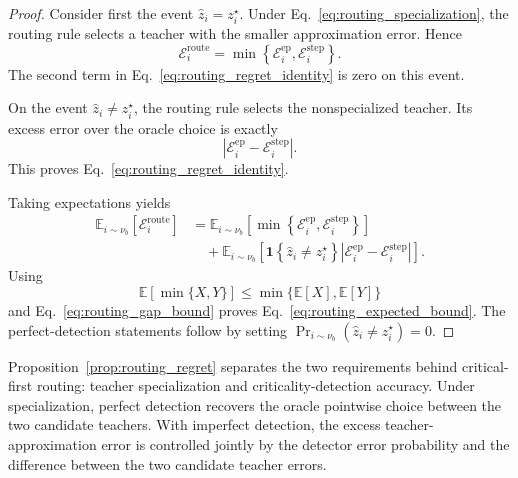 \documentclass{llmxive}
\begin{document}
\begin{proof}
Consider first the event
\(\widehat z_i=z_i^\star\). Under
Eq.~\ref{eq:routing_specialization}, the routing rule selects a teacher
with the smaller approximation error. Hence
\begin{equation*}
 \mathcal E_i^{\mathrm{route}}
 =
 \min
 \left\{
   \mathcal E_i^{\mathrm{ep}},
   \mathcal E_i^{\mathrm{step}}
 \right\}.
\end{equation*}
The second term in Eq.~\ref{eq:routing_regret_identity} is zero on this
event.

On the event
\(\widehat z_i\ne z_i^\star\), the routing rule selects the nonspecialized
teacher. Its excess error over the oracle choice is exactly
\begin{equation*}
 \left|
   \mathcal E_i^{\mathrm{ep}}
   -
   \mathcal E_i^{\mathrm{step}}
 \right|.
\end{equation*}
This proves Eq.~\ref{eq:routing_regret_identity}.

Taking expectations yields
\begin{equation*}
\begin{aligned}
 \mathbb E_{i\sim\nu_b}
 \left[
   \mathcal E_i^{\mathrm{route}}
 \right]
 &=
 \mathbb E_{i\sim\nu_b}
 \left[
   \min
   \left\{
     \mathcal E_i^{\mathrm{ep}},
     \mathcal E_i^{\mathrm{step}}
   \right\}
 \right]
 \\
 &\quad+
 \mathbb E_{i\sim\nu_b}
 \left[
   \mathbf 1
   \left\{
     \widehat z_i\ne z_i^\star
   \right\}
   \left|
     \mathcal E_i^{\mathrm{ep}}
     -
     \mathcal E_i^{\mathrm{step}}
   \right|
 \right].
\end{aligned}
\end{equation*}
Using
\begin{equation*}
 \mathbb E[\min\{X,Y\}]
 \le
 \min\{\mathbb E[X],\mathbb E[Y]\}
\end{equation*}
and Eq.~\ref{eq:routing_gap_bound} proves
Eq.~\ref{eq:routing_expected_bound}. The perfect-detection statements
follow by setting
\(\Pr_{i\sim\nu_b}(\widehat z_i\ne z_i^\star)=0\).
\end{proof}

Proposition~\ref{prop:routing_regret} separates the two requirements behind
critical-first routing: teacher specialization and criticality-detection
accuracy. Under specialization, perfect detection recovers the oracle
pointwise choice between the two candidate teachers. With imperfect
detection, the excess teacher-approximation error is controlled jointly by
the detector error probability and the difference between the two candidate
teacher errors.
\end{document}
